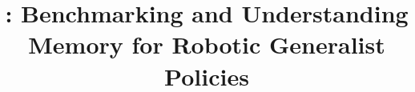 \documentclass[10pt,letterpaper]{article}
\title{\benchname: Benchmarking and Understanding Memory for Robotic Generalist Policies}
\begin{document}
\nolinenumbers


{
    \small
    
    
}
\end{document}
